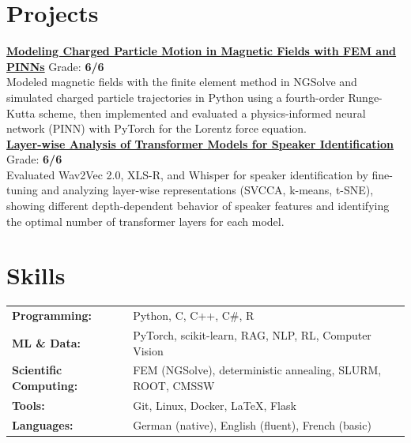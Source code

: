 \documentclass[a4paper,10pt]{article}
\begin{document}
\section*{Projects}
\href{https://github.com/Saxermi/hana_pde_modeling_fem/blob/main/Hana_projekt.pdf}{\textbf{Modeling Charged Particle Motion in Magnetic Fields with FEM and PINNs}} \hfill Grade: \textbf{6/6}\\
Modeled magnetic fields with the finite element method in NGSolve and simulated charged particle trajectories in Python using a fourth-order Runge-Kutta scheme, then implemented and evaluated a physics-informed neural network (PINN) with PyTorch for the Lorentz force equation.
\vspace{3mm}\\
\href{https://github.com/slinusc/speaker_identification_evaluation/blob/main/Evaluating_the_Effectiveness_of_Transformer_Layers.pdf}{\textbf{Layer-wise Analysis of Transformer Models for Speaker Identification}} \hfill Grade: \textbf{6/6}\\
Evaluated Wav2Vec 2.0, XLS-R, and Whisper for speaker identification by fine-tuning and analyzing layer-wise representations (SVCCA, k-means, t-SNE), showing different depth-dependent behavior of speaker features and identifying the optimal number of transformer layers for each model.


\vspace{0.5em}




\section*{Skills}

\begin{tabularx}{\linewidth}{@{}lX@{}}
\textbf{Programming:} & Python, C, C++, C\#, R \\[2pt]
\textbf{ML \& Data:} & PyTorch, scikit-learn, RAG, NLP, RL, Computer Vision \\[2pt]
\textbf{Scientific Computing:} & FEM (NGSolve), deterministic annealing, SLURM, ROOT, CMSSW \\[2pt]
\textbf{Tools:} & Git, Linux, Docker, \LaTeX, Flask \\[2pt]
\textbf{Languages:} & German (native), English (fluent), French (basic)
\end{tabularx}
\end{document}
